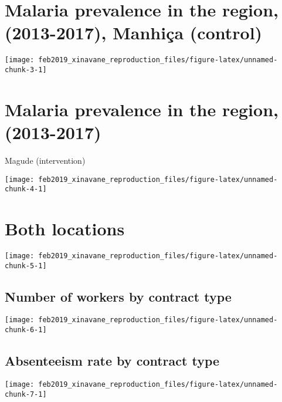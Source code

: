 \documentclass[]{article}
\begin{document}
\newpage

\section{Malaria prevalence in the region, (2013-2017), Manhiça
(control)}\label{malaria-prevalence-in-the-region-2013-2017-manhica-control}

\begin{center}\texttt{[image: feb2019\_xinavane\_reproduction\_files/figure-latex/unnamed-chunk-3-1]} \end{center}

\section{Malaria prevalence in the region,
(2013-2017)}\label{malaria-prevalence-in-the-region-2013-2017}

Magude (intervention)

\begin{center}\texttt{[image: feb2019\_xinavane\_reproduction\_files/figure-latex/unnamed-chunk-4-1]} \end{center}

\section{Both locations}\label{both-locations}

\begin{center}\texttt{[image: feb2019\_xinavane\_reproduction\_files/figure-latex/unnamed-chunk-5-1]} \end{center}

\subsection{Number of workers by contract
type}\label{number-of-workers-by-contract-type}

\begin{center}\texttt{[image: feb2019\_xinavane\_reproduction\_files/figure-latex/unnamed-chunk-6-1]} \end{center}

\subsection{Absenteeism rate by contract
type}\label{absenteeism-rate-by-contract-type}

\begin{center}\texttt{[image: feb2019\_xinavane\_reproduction\_files/figure-latex/unnamed-chunk-7-1]} \end{center}
\end{document}
